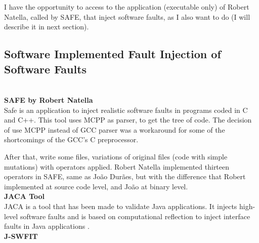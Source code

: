 


I have the opportunity to access to the application (executable only)
of Robert Natella, called by SAFE, that inject software faults, as I also want to do (I will describe it in next section).

\clearpage
\subsection{Software Implemented Fault Injection of Software Faults}
\\

\textbf{SAFE by Robert Natella}\\

Safe is an application to inject realistic software faults in programs coded in C and C++.
This tool uses MCPP as parser, to get the tree of code. The decision of use MCPP instead of GCC parser was a workaround for some of the shortcomings of the GCC's C preprocessor.

After that, write some files, variations of original files (code with simple mutations) with operators applied.
Robert Natella implemented thirteen operators in SAFE, same as João Durães\cite{duraes2006emulation}, but with the difference that Robert implemented at source code level, and João at binary level.\\


\textbf{JACA Tool}\\

JACA\cite{regina2003jaca} is a tool that has been made to validate Java applications. It injects high-level software faults and is based on computational reflection to inject interface faults in Java applications
\cite{martins2002jaca}. \\

\textbf{J-SWFIT} \\

